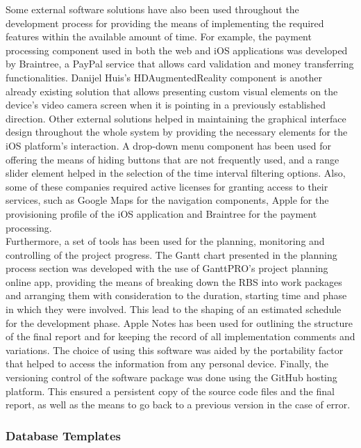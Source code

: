 Some external software solutions have also been used throughout the development process for providing the means of implementing the required features within the available amount of time. For example, the payment processing component used in both the web and iOS applications was developed by Braintree, a PayPal service that allows card validation and money transferring functionalities\cite{braintree}. Danijel Huis's HDAugmentedReality component is another already existing solution that allows presenting custom visual elements on the device's video camera screen when it is pointing in a previously established direction\cite{huis_2017}. Other external solutions helped in maintaining the graphical interface design throughout the whole system by providing the necessary elements for the iOS platform's interaction. A drop-down menu component has been used for offering the means of hiding buttons that are not frequently used, and a range slider element helped in the selection of the time interval filtering options. Also, some of these companies required active licenses for granting access to their services, such as Google Maps for the navigation components, Apple for the provisioning profile of the iOS application and Braintree for the payment processing.\\

Furthermore, a set of tools has been used for the planning, monitoring and controlling of the project progress. The Gantt chart presented in the planning process section was developed with the use of GanttPRO's project planning online app, providing the means of breaking down the RBS into work packages and arranging them with consideration to the duration, starting time and phase in which they were involved. This lead to the shaping of an estimated schedule for the development phase\cite{ganttpro_2017}. Apple Notes has been used for outlining the structure of the final report and for keeping the record of all implementation comments and variations\cite{notes_2017}. The choice of using this software was aided by the portability factor that helped to access the information from any personal device. Finally, the versioning control of the software package was done using the GitHub hosting platform\cite{github_2017}. This ensured a persistent copy of the source code files and the final report, as well as the means to go back to a previous version in the case of error.\\

\subsubsection{Database Templates}


